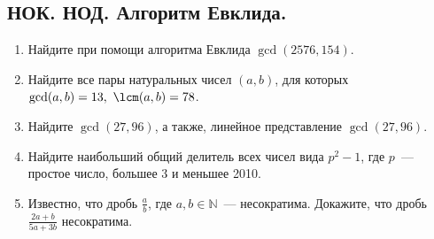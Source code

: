 \documentclass[11pt]{article}
\begin{document}
    \subsection{НОК. НОД. Алгоритм Евклида. }
    \begin{enumerate}[start=25,label={\bfseries \arabic*.}]
        \item Найдите при помощи алгоритма Евклида $\gcd(2576, 154)$.

        \item Найдите все пары натуральных чисел $(a, b)$, для которых $\gcd(a, b) = 13, \ \lcm(a, b) = 78$.

        \item Найдите $\gcd(27, 96)$, а также, линейное представление $\gcd(27, 96)$.

        \item Найдите наибольший общий делитель всех чисел вида $p^2 - 1$, где $p$~--- простое число, большее 3 и меньшее 2010.

        \item Известно, что дробь $\frac{a}{b}$, где $a, b \in \mathbb{N}$~--- несократима. Докажите, что дробь $\frac{2a + b}{5a + 3b}$ несократима.
    \end{enumerate}
\end{document}
